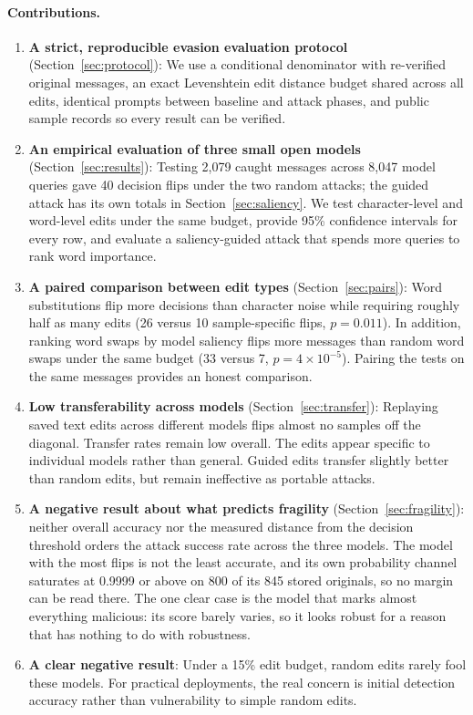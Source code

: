 \paragraph{Contributions.}
\begin{enumerate}
\item \textbf{A strict, reproducible evasion evaluation protocol}
  (Section~\ref{sec:protocol}): We use a conditional denominator with re-verified
  original messages, an exact Levenshtein edit distance budget shared across all
  edits, identical prompts between baseline and attack phases, and public
  sample records so every result can be verified.
\item \textbf{An empirical evaluation of three small open models}
  (Section~\ref{sec:results}): Testing 2{,}079 caught messages across 8{,}047 model
  queries gave 40 decision flips under the two random attacks; the guided attack
  has its own totals in Section~\ref{sec:saliency}. We test character-level and
  word-level edits under the same budget, provide 95\% confidence intervals for
  every row, and evaluate a saliency-guided attack that spends more queries to
  rank word importance.
\item \textbf{A paired comparison between edit types}
  (Section~\ref{sec:pairs}): Word substitutions flip more decisions than
  character noise while requiring roughly half as many edits (26 versus 10
  sample-specific flips, $p=0.011$). In addition, ranking word swaps by model
  saliency flips more messages than random word swaps under the same budget
  (33 versus 7, $p=4\times10^{-5}$). Pairing the tests on the same messages
  provides an honest comparison.
\item \textbf{Low transferability across models} (Section~\ref{sec:transfer}):
  Replaying saved text edits across different models flips almost no samples off
  the diagonal. Transfer rates remain low overall. The edits appear specific to
  individual models rather than general. Guided edits transfer slightly better
  than random edits, but remain ineffective as portable attacks.
\item \textbf{A negative result about what predicts fragility}
  (Section~\ref{sec:fragility}): neither overall accuracy nor the measured distance
  from the decision threshold orders the attack success rate across the three
  models. The model with the most flips is not the least accurate, and its own
  probability channel saturates at 0.9999 or above on 800 of its 845 stored
  originals, so no margin can be read there. The one clear case is the model
  that marks almost everything malicious: its score barely varies, so it looks
  robust for a reason that has nothing to do with robustness.
\item \textbf{A clear negative result}: Under a 15\% edit budget, random edits
  rarely fool these models. For practical deployments, the real concern is
  initial detection accuracy rather than vulnerability to simple random edits.
\end{enumerate}

